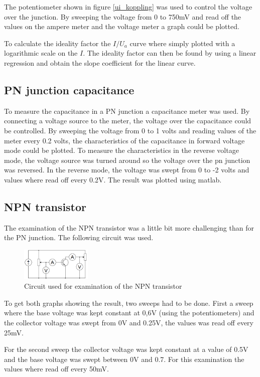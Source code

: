 \documentclass[a4paper]{article}
\begin{document}
The potentiometer shown in figure \ref{ui_koppling} was used to control the voltage over the junction. By sweeping the voltage from 0 to 750mV and read off the values on the ampere meter and the voltage meter a graph could be plotted.

To calculate the ideality factor the $I/U_a$ curve where simply plotted with a logarithmic scale on the $I$. The ideality factor can then be found by using a linear regression and obtain the slope coefficient for the linear curve. 

\subsection{PN junction capacitance}
To measure the capacitance in a PN junction a capacitance meter was used. By connecting a voltage source to the meter, the voltage over the capacitance could be controlled. By sweeping the voltage from 0 to 1 volts and reading values of the meter every 0.2 volts, the characteristics of the capacitance in forward voltage mode could be plotted. To measure the characteristics in the reverse voltage mode, the voltage source was turned around so the voltage over the pn junction was reversed. In the reverse mode, the voltage was swept from 0 to -2 volts and values where read off every 0.2V. The result was plotted using matlab.

\subsection{NPN transistor}
The examination of the NPN transistor was a little bit more challenging than for the PN junction. The following circuit was used.

\begin{figure}[H]
	\centering
	\includegraphics[width=0.3\textwidth]{npn_circuit.png}
	\caption{Circuit used for examination of the NPN transistor}
	\label{npn_koppling}
\end{figure}
To get both graphs showing the result, two sweeps had to be done. First a sweep where the base voltage was kept constant at 0,6V (using the potentiometers) and the collector voltage was swept from 0V and 0.25V, the values was read off every 25mV.

For the second sweep the collector voltage was kept constant at a value of 0.5V and the base voltage was swept between 0V and 0.7. For this examination the values where read off every 50mV.
\end{document}
